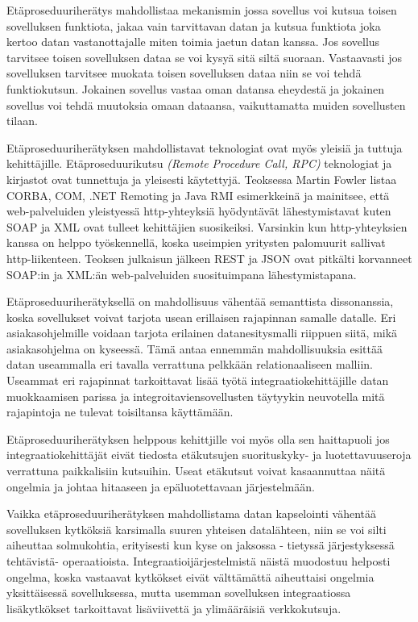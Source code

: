 Etäproseduuriherätys mahdollistaa mekanismin jossa sovellus voi kutsua toisen sovelluksen funktiota, jakaa vain tarvittavan datan ja kutsua funktiota joka kertoo datan vastanottajalle miten toimia jaetun datan kanssa.
Jos sovellus tarvitsee toisen sovelluksen dataa se voi kysyä sitä siltä suoraan. Vastaavasti jos sovelluksen tarvitsee muokata toisen sovelluksen dataa niin se voi tehdä funktiokutsun.
Jokainen sovellus vastaa oman datansa eheydestä ja jokainen sovellus voi tehdä muutoksia omaan dataansa, vaikuttamatta muiden sovellusten tilaan.

Etäproseduuriherätyksen mahdollistavat teknologiat ovat myös yleisiä ja tuttuja kehittäjille. Etäproseduurikutsu \textit{(Remote Procedure Call, RPC)} teknologiat ja kirjastot ovat tunnettuja ja yleisesti käytettyjä. Teoksessa \citep[sivu~71]{Hohpe2004} Martin Fowler listaa CORBA, COM, .NET Remoting ja Java RMI esimerkkeinä ja mainitsee, että web-palveluiden yleistyessä http-yhteyksiä hyödyntävät lähestymistavat kuten SOAP ja XML ovat tulleet kehittäjien suosikeiksi. Varsinkin kun http-yhteyksien kanssa on helppo työskennellä, koska useimpien yritysten palomuurit sallivat http-liikenteen. Teoksen julkaisun jälkeen REST ja JSON ovat pitkälti korvanneet SOAP:in ja XML:än web-palveluiden suosituimpana lähestymistapana.

Etäproseduuriherätyksellä on mahdollisuus vähentää  semanttista dissonanssia, koska sovellukset voivat tarjota usean erillaisen rajapinnan samalle datalle. Eri asiakasohjelmille voidaan tarjota erilainen datanesitysmalli riippuen siitä, mikä asiakasohjelma on kyseessä. Tämä antaa ennemmän mahdollisuuksia esittää datan useammalla eri tavalla verrattuna pelkkään relationaaliseen malliin.
Useammat eri rajapinnat tarkoittavat lisää työtä integraatiokehittäjille datan muokkaamisen parissa ja integroitaviensovellusten täytyykin neuvotella mitä rajapintoja ne tulevat toisiltansa käyttämään.

Etäproseduuriherätyksen helppous kehittjille voi myös olla sen haittapuoli jos integraatiokehittäjät eivät tiedosta etäkutsujen suorituskyky- ja luotettavuuseroja verrattuna paikkalisiin kutsuihin. Useat etäkutsut voivat kasaannuttaa näitä ongelmia ja johtaa hitaaseen ja epäluotettavaan järjestelmään.

Vaikka etäproseduuriherätyksen mahdollistama datan kapselointi vähentää sovelluksen kytköksiä karsimalla suuren yhteisen datalähteen, niin se voi silti aiheuttaa solmukohtia, erityisesti kun kyse on jaksossa - tietyssä järjestyksessä tehtävistä- operaatioista. Integraatioijärjestelmistä näistä muodostuu helposti ongelma, koska vastaavat kytkökset eivät välttämättä aiheuttaisi ongelmia yksittäisessä sovelluksessa, mutta usemman sovelluksen integraatiossa lisäkytkökset tarkoittavat lisäviivettä ja ylimääräisiä verkkokutsuja.

